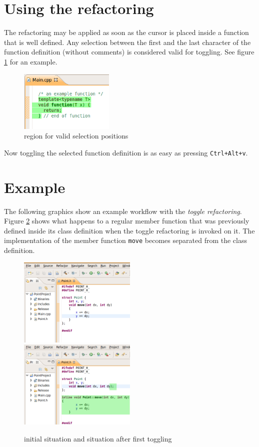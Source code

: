 \section{Using the refactoring}

The refactoring may be applied as soon as the cursor is placed inside a function 
that is well defined. Any selection between the first and the last character of 
the function definition (without comments) is considered valid for toggling. See 
figure \ref{selection} for an example.
\begin{figure}[h]
\centering
\includegraphics[width=0.4\textwidth]{images/selection.png}
\caption{region for valid selection positions}
\label{selection}
\end{figure}

Now toggling the selected function definition is as easy as pressing 
\texttt{Ctrl+Alt+v}.

\section{Example}

The following graphics show an example workflow with the \textit{toggle 
refactoring}. Figure \ref{exampleA} shows what happens to a regular member 
function that was previously defined inside its class definition when the toggle 
refactoring is invoked on it. The implementation of the member function 
\texttt{move} becomes separated from the class definition.

\begin{figure}[h]
\includegraphics[width=0.5\textwidth]{images/step1.png}
\includegraphics[width=0.5\textwidth]{images/step2.png}
\caption{initial situation and situation after first toggling}
\label{exampleA}
\end{figure}

